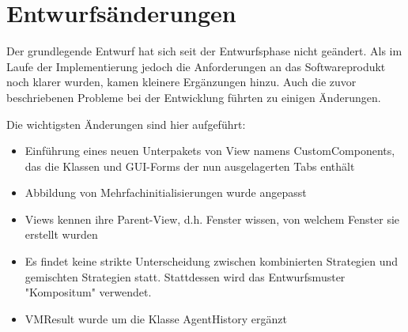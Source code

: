 \section{Entwurfsänderungen}

Der grundlegende Entwurf hat sich seit der Entwurfsphase nicht geändert. Als im Laufe der Implementierung jedoch die Anforderungen an das Softwareprodukt noch klarer wurden, kamen kleinere Ergänzungen hinzu. Auch die zuvor beschriebenen Probleme bei der Entwicklung führten zu einigen Änderungen.

Die wichtigsten Änderungen sind hier aufgeführt:

\begin{itemize}
\item Einführung eines neuen Unterpakets von View namens CustomComponents, das die Klassen und GUI-Forms der nun ausgelagerten Tabs enthält

\item Abbildung von Mehrfachinitialisierungen wurde angepasst

\item Views kennen ihre Parent-View, d.h. Fenster wissen, von welchem Fenster sie erstellt wurden

\item Es findet keine strikte Unterscheidung zwischen kombinierten Strategien und gemischten Strategien statt. Stattdessen wird das Entwurfsmuster "Kompositum" verwendet.

\item VMResult wurde um die Klasse AgentHistory ergänzt

\end{itemize}